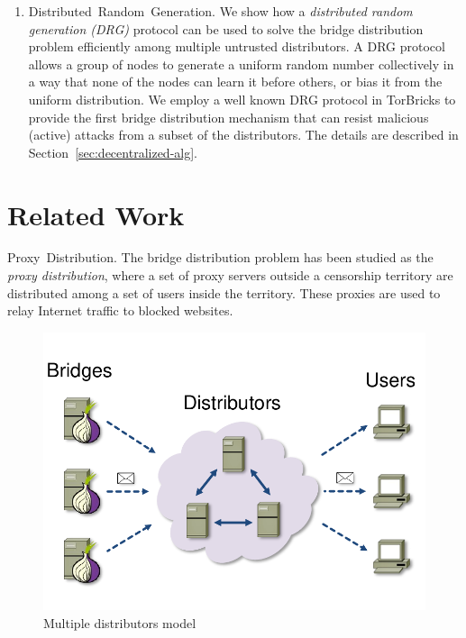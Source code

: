 \documentclass{sig-alternate-05-2015}
\newcommand{\bricks}{}
\def\bricks/{\mbox{TorBricks}}
\newcommand{\sfsize}{\fontsize{0.8\baselineskip}{0.68\baselineskip}\selectfont}
\newcommand{\sans}[1]{\textsf{\sfsize \mbox{#1}}}
\newcommand{\para}[1]{\vspace{0.55em} \noindent \sans{{\mbox{#1}}}}
\begin{document}
\begin{enumerate}[leftmargin=1.7em, itemsep=0.7em, topsep=0.6em]
	
	\item \sans{Distributed Random Generation.} We show how a \emph{distributed random generation (DRG)} protocol can be used to solve the bridge distribution problem efficiently among multiple untrusted distributors. A DRG protocol allows a group of nodes to generate a uniform random number collectively in a way that none of the nodes can learn it before others, or bias it from the uniform distribution. We employ a well known DRG protocol in \bricks/ to provide the first bridge distribution mechanism that can resist malicious (active) attacks from a subset of the distributors. The details are described in Section~\ref{sec:decentralized-alg}.
\end{enumerate}

\section{Related Work} \label{sec:relatedwork}
\para{Proxy Distribution.} The bridge distribution problem has been studied as the \emph{proxy distribution}, where a set of proxy servers outside a censorship territory are distributed among a set of users inside the territory. These proxies are used to relay Internet traffic to blocked websites. 

\begin{figure}[t]
	\centering
	\includegraphics[width=0.7\linewidth]{images/multi-alg}
	\caption{Multiple distributors model}
	\label{fig:multidist}
\end{figure}
\end{document}
